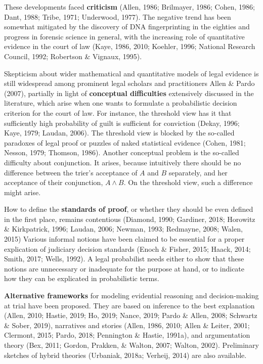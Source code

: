 \documentclass[11pt,dvipsnames,enabledeprecatedfontcommands]{scrartcl}
\begin{document}
These developments faced \textbf{criticism} (Allen, 1986; Brilmayer,
1986; Cohen, 1986; Dant, 1988; Tribe, 1971; Underwood, 1977). The
negative trend has been somewhat mitigated by the discovery of DNA
fingerprinting in the eighties and progress in forensic science in
general, with the increasing role of quantitative evidence in the court
of law (Kaye, 1986, 2010; Koehler, 1996; National Research Council,
1992; Robertson \& Vignaux, 1995).

Skepticism about wider mathematical and quantitative models of legal
evidence is still widespread among prominent legal scholars and
practitioners Allen \& Pardo (2007), partially in light of
\textbf{conceptual difficulties} extensively discussed in the
literature, which arise when one wants to formulate a probabilistic
decision criterion for the court of law. For instance, the threshold
view has it that sufficiently high probability of guilt is sufficient
for conviction (Dekay, 1996; Kaye, 1979; Laudan, 2006). The threshold
view is blocked by the so-called paradoxes of legal proof or puzzles of
naked statistical evidence (Cohen, 1981; Nesson, 1979; Thomson, 1986).
Another conceptual problem is the so-called difficulty about
conjunction. It arises, because intuitively there should be no
difference between the trier's acceptance of \(A\) and \(B\) separately,
and her acceptance of their conjunction, \(A\wedge B\). On the threshold
view, such a difference might arise.

How to define the \textbf{standards of proof}, or whether they should be
even defined in the first place, remains contentious (Diamond, 1990;
Gardiner, 2018; Horowitz \& Kirkpatrick, 1996; Laudan, 2006; Newman,
1993; Redmayne, 2008; Walen, 2015) Various informal notions have been
claimed to be essential for a proper explication of judiciary decision
standards (Enoch \& Fisher, 2015; Haack, 2014; Smith, 2017; Wells,
1992). A legal probabilist needs either to show that these notions are
unnecessary or inadequate for the purpose at hand, or to indicate how
they can be explicated in probabilistic terms.

\textbf{Alternative frameworks} for modeling evidential reasoning and
decision-making at trial have been proposed. They are based on inference
to the best explanation (Allen, 2010; Hastie, 2019; Ho, 2019; Nance,
2019; Pardo \& Allen, 2008; Schwartz \& Sober, 2019), narratives and
stories (Allen, 1986, 2010; Allen \& Leiter, 2001; Clermont, 2015;
Pardo, 2018; Pennington \& Hastie, 1991a), and argumentation theory
(Bex, 2011; Gordon, Prakken, \& Walton, 2007; Walton, 2002). Preliminary
sketches of hybrid theories (Urbaniak, 2018a; Verheij, 2014) are also
available.
\end{document}
